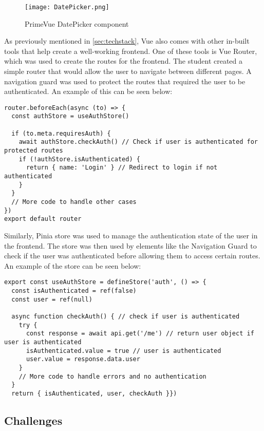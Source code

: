 \begin{figure}[htbp]
  \centering
  \texttt{[image: DatePicker.png]}
  \caption{PrimeVue DatePicker component}
  \label{fig:datepicker}
\end{figure}

\FloatBarrier

As previously mentioned in \ref{sec:techstack}, Vue also comes with other in-built tools that help create a well-working frontend. One of these tools is Vue Router, which was used to create the routes for the frontend. The student created a simple router that would allow the user to navigate between different pages. A navigation guard was used to protect the routes that required the user to be authenticated. An example of this can be seen below:

\begin{lstlisting}[caption=Vue Router Navigation Guard]
router.beforeEach(async (to) => {
  const authStore = useAuthStore()

  if (to.meta.requiresAuth) {
    await authStore.checkAuth() // Check if user is authenticated for protected routes
    if (!authStore.isAuthenticated) {
      return { name: 'Login' } // Redirect to login if not authenticated
    }
  } 
  // More code to handle other cases
})
export default router
\end{lstlisting}

Similarly, Pinia store was used to manage the authentication state of the user in the frontend. The store was then used by elements like the Navigation Guard to check if the user was authenticated before allowing them to access certain routes. An example of the store can be seen below:

\begin{lstlisting}[caption=Pinia Store for Authentication]
export const useAuthStore = defineStore('auth', () => {
  const isAuthenticated = ref(false)
  const user = ref(null)

  async function checkAuth() { // check if user is authenticated
    try {
      const response = await api.get('/me') // return user object if user is authenticated
      isAuthenticated.value = true // user is authenticated
      user.value = response.data.user
    }
    // More code to handle errors and no authentication
  }
  return { isAuthenticated, user, checkAuth }})
\end{lstlisting}

\subsection{Challenges}

